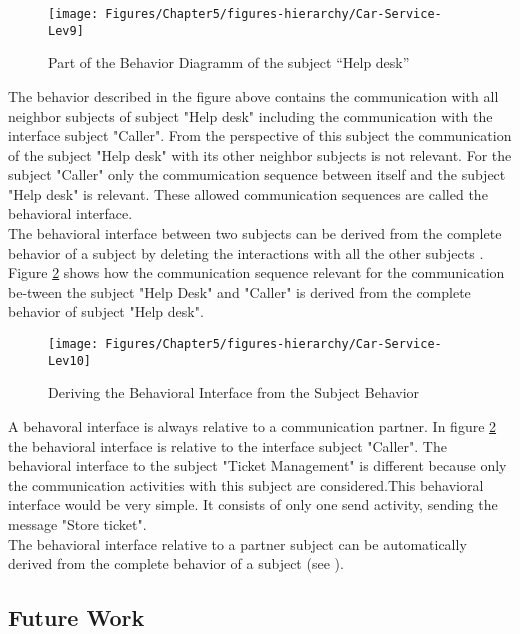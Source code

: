 \begin{figure}[htbp]
	\centering
	\texttt{[image: Figures/Chapter5/figures-hierarchy/Car-Service-Lev9]}
	\caption[Part of the Behavior Diagramm of the subject “Help desk”]{Part of the Behavior Diagramm of the subject “Help desk”}
	\label{fig:car-service-lev9}
\end{figure}


The behavior described in the figure above contains the communication with all neighbor subjects of subject "Help desk" including the communication with the interface subject "Caller". From the perspective of this subject the communication of the subject "Help desk" with its other neighbor subjects is not relevant. For the subject "Caller" only the commumication sequence between itself and the subject "Help desk" is relevant. These allowed communication sequences are called the behavioral interface.\\
The behavioral interface between two subjects can be derived from the complete behavior of a subject by deleting the interactions with all the other subjects . Figure \ref{fig:car-service-lev10} shows how the communication sequence relevant for the communication be-tween the subject "Help Desk" and "Caller" is derived from the complete behavior of subject "Help desk".

\begin{figure}[htbp]
	\centering
	\texttt{[image: Figures/Chapter5/figures-hierarchy/Car-Service-Lev10]}
	\caption[Deriving the Behavioral Interface from the Subject Behavior]{Deriving the Behavioral Interface from the Subject Behavior}
	\label{fig:car-service-lev10}
\end{figure}

A behavoral interface is always relative to a communication partner. In figure \ref{fig:car-service-lev10} the behavioral interface is relative to the interface subject "Caller". The behavioral interface to the subject "Ticket Management" is different because only the communication activities with this subject are considered.This behavioral interface would be very simple. It consists of only one send activity, sending the message "Store ticket".\\
The behavioral interface relative to a partner subject can be automatically derived from the complete behavior of a subject
(see \cite{article:jCPEX}).

\subsection{Future Work}

